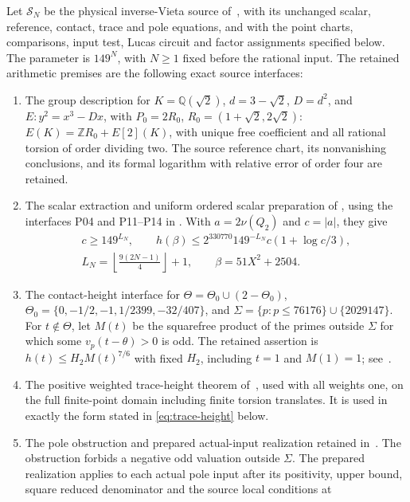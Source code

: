 \documentclass[11pt,a4paper]{article}
\newcommand{\Q}{\mathbb Q}\newcommand{\Z}{\mathbb Z}
\begin{document}
Let $\mathcal S_N$ be the physical inverse-Vieta source
of~\cite{InverseVieta}, with its unchanged scalar, reference, contact,
trace and pole equations, and with the point charts, comparisons,
input test, Lucas circuit and factor assignments specified below.
The parameter is $149^N$, with $N\ge1$ fixed before the rational input.
The retained arithmetic premises are the following exact source
interfaces:
\begin{enumerate}
\item The group description for
$K=\Q(\sqrt2)$, $d=3-\sqrt2$, $D=d^2$, and
$E:y^2=x^3-Dx$, with $P_0=2R_0$,
$R_0=(1+\sqrt2,2\sqrt2)$:
$E(K)=\Z R_0+E[2](K)$, with unique free coefficient and all rational
torsion of order dividing two. The source reference chart, its
nonvanishing conclusions, and its formal logarithm with relative
error of order four are retained.
\item The scalar extraction and uniform ordered scalar preparation of
\cite{InverseVieta}, using the interfaces P04 and P11--P14 in
\cite{Uniform}. With $a=2\nu(Q_2)$ and $c=|a|$, they give
\begin{equation}\label{eq:scalar-bound}
 \begin{gathered}
 c\ge149^{L_N},\qquad
 h(\beta)\le 2^{330770}149^{-L_N}c(1+\log c/3),\\
 L_N=\left\lfloor\frac{9(2N-1)}4\right\rfloor+1,
 \qquad \beta=51X^2+2504.
 \end{gathered}
\end{equation}
\item The contact-height interface for
$\Theta=\Theta_0\cup(2-\Theta_0)$,
$\Theta_0=\{0,-1/2,-1,1/2399,-32/407\}$, and
$\Sigma=\{p:p\le76176\}\cup\{2029147\}$.
For $t\notin\Theta$, let $M(t)$ be the squarefree product of the
primes outside $\Sigma$ for which some $v_p(t-\theta)>0$ is odd.
The retained assertion is $h(t)\le H_2 M(t)^{7/6}$ with fixed $H_2$,
including $t=1$ and $M(1)=1$; see~\cite{Quartic204,Uniform}.
\item The positive weighted trace-height theorem of~\cite{Weighted},
used with all weights one, on the full finite-point domain including
finite torsion translates. It is used in exactly the form stated in
\eqref{eq:trace-height} below.
\item The pole obstruction and prepared actual-input realization
retained in~\cite{InverseVieta,Poles,Uniform}. The obstruction forbids
a negative odd valuation outside $\Sigma$. The prepared realization
applies to each actual pole input after its positivity, upper bound,
square reduced denominator and the source local conditions at

\end{enumerate}
\end{document}
